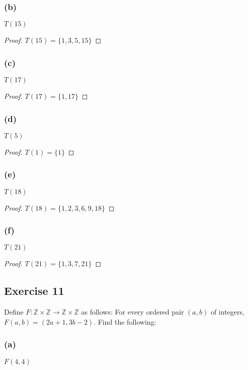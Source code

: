 \documentclass[14pt]{extarticle}
\newcommand{\Z}{\mathbb{Z}}
\begin{document}
\subsubsection{(b)}
$T(15)$

\begin{proof}
    \(T(15) = \{1, 3, 5, 15\}\)
\end{proof}

\subsubsection{(c)}
$T(17)$

\begin{proof}
    \(T(17) = \{1, 17\}\)
\end{proof}

\subsubsection{(d)}
$T(5)$

\begin{proof}
    \(T(1) = \{1\}\)
\end{proof}

\subsubsection{(e)}
$T(18)$

\begin{proof}
    \(T(18) = \{1, 2, 3, 6, 9, 18\}\)
\end{proof}

\subsubsection{(f)}
$T(21)$

\begin{proof}
    \(T(21) = \{1, 3, 7, 21\}\)
\end{proof}

\subsection{Exercise 11}
Define \(F: \Z \times \Z \to \Z \times \Z\) as follows: For every ordered pair \((a,b)\) of integers, \(F(a,b) = (2a+1,
3b-2)\). Find the following:

\subsubsection{(a)}
$F(4,4)$
\end{document}
